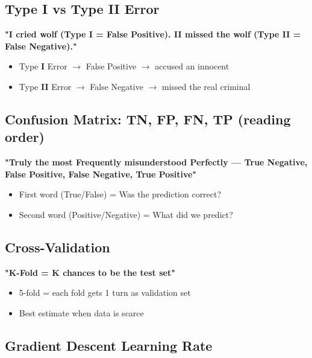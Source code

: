 \documentclass[11pt]{article}
\providecommand{\tightlist}{\setlength{\itemsep}{1pt}\setlength{\parskip}{0pt}}
\begin{document}
\subsection{Type I vs Type II Error}\label{type-i-vs-type-ii-error}

\textbf{"I cried wolf (Type I = False Positive). II missed the wolf (Type II = False Negative)."}

\begin{itemize}
\tightlist
\item
  Type \textbf{I} Error \(\rightarrow\) False Positive \(\rightarrow\) accused an innocent
\item
  Type \textbf{II} Error \(\rightarrow\) False Negative \(\rightarrow\) missed the real criminal
\end{itemize}

\subsection{Confusion Matrix: TN, FP, FN, TP (reading order)}\label{confusion-matrix-tn-fp-fn-tp-reading-order}

\textbf{"Truly the most Frequently misunderstood Perfectly --- True Negative, False Positive, False Negative, True Positive"}

\begin{itemize}
\tightlist
\item
  First word (True/False) = Was the prediction correct?
\item
  Second word (Positive/Negative) = What did we predict?
\end{itemize}

\subsection{Cross-Validation}\label{cross-validation-1}

\textbf{"K-Fold = K chances to be the test set"}

\begin{itemize}
\tightlist
\item
  5-fold = each fold gets 1 turn as validation set
\item
  Best estimate when data is scarce
\end{itemize}

\subsection{Gradient Descent Learning Rate}\label{gradient-descent-learning-rate}
\end{document}
